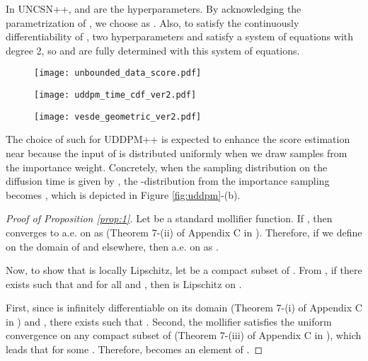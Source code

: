 \documentclass[nohyperref]{article}
\theoremstyle{plain}
\theoremstyle{definition}
\theoremstyle{remark}
\begin{document}
	In UNCSN++,  and  are the hyperparameters. By acknowledging the parametrization of , we choose  as . Also, to satisfy the continuously differentiability of , two hyperparameters  and  satisfy a system of equations with degree 2, so  and  are fully determined with this system of equations.
	
\begin{figure*}[t]
\centering
	\begin{subfigure}{0.32\linewidth}
	\texttt{[image: unbounded\_data\_score.pdf]}
	\end{subfigure}
	\hfil
	\begin{subfigure}{0.32\linewidth}
	\texttt{[image: uddpm\_time\_cdf\_ver2.pdf]}
	\end{subfigure}
	\hfil
	\begin{subfigure}{0.32\linewidth}
	\texttt{[image: vesde\_geometric\_ver2.pdf]}
	\end{subfigure}
	\caption{(a) The approximate data score, , diverges as . (b) Comparison of DDPM++ and UDDPM++ in terms of the cumulative density function of the second input. (c) Comparison of VESDE and RVESDE in terms of .}
	\label{fig:uddpm}
\end{figure*}
The choice of such  for UDDPM++ is expected to enhance the score estimation near  because the input of  is distributed uniformly when we draw samples from the importance weight. Concretely, when the sampling distribution on the diffusion time is given by , the -distribution from the importance sampling becomes , which is depicted in Figure \ref{fig:uddpm}-(b).

	
	
	
	
	\begin{proof}[Proof of Proposition \ref{prop:1}]
		Let  be a standard mollifier function. If , then  converges to  a.e. on  as  (Theorem 7-(ii) of Appendix C in \cite{evans1998partial}). Therefore, if we define  on the domain of  and  elsewhere, then  a.e. on  as .
		
		Now, to show that  is locally Lipschitz, let  be a compact subset of . From , if there exists  such that  and  for all  and , then  is Lipschitz on . 
		
		First, since  is infinitely differentiable on its domain (Theorem 7-(i) of Appendix C in \cite{evans1998partial}) and , there exists  such that . Second, the mollifier satisfies the uniform convergence on any compact subset of  (Theorem 7-(iii) of Appendix C in \cite{evans1998partial}), which leads that  for some . Therefore,  becomes an element of .
	\end{proof}	
\end{document}
